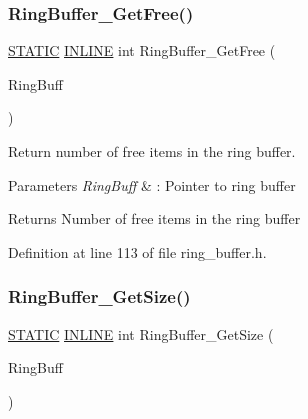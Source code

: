\subsubsection{\texorpdfstring{Ring\+Buffer\+\_\+\+Get\+Free()}{RingBuffer\_GetFree()}}
{\footnotesize\ttfamily \hyperlink{group___l_p_c___types___public___macros_ga10b2d890d871e1489bb02b7e70d9bdfb}{S\+T\+A\+T\+IC} \hyperlink{spifi__18xx__43xx_8h_a2eb6f9e0395b47b8d5e3eeae4fe0c116}{I\+N\+L\+I\+NE} int Ring\+Buffer\+\_\+\+Get\+Free (\begin{DoxyParamCaption}\item[{\hyperlink{struct_r_i_n_g_b_u_f_f___t}{R\+I\+N\+G\+B\+U\+F\+F\+\_\+T} $\ast$}]{Ring\+Buff }\end{DoxyParamCaption})}



Return number of free items in the ring buffer. 


\begin{DoxyParams}{Parameters}
{\em Ring\+Buff} & \+: Pointer to ring buffer \\
\hline
\end{DoxyParams}
\begin{DoxyReturn}{Returns}
Number of free items in the ring buffer 
\end{DoxyReturn}


Definition at line 113 of file ring\+\_\+buffer.\+h.

\mbox{\label{group___ring___buffer_ga2fc4b40b03afb19c8ea942da3cf3faf1}} 
\subsubsection{\texorpdfstring{Ring\+Buffer\+\_\+\+Get\+Size()}{RingBuffer\_GetSize()}}
{\footnotesize\ttfamily \hyperlink{group___l_p_c___types___public___macros_ga10b2d890d871e1489bb02b7e70d9bdfb}{S\+T\+A\+T\+IC} \hyperlink{spifi__18xx__43xx_8h_a2eb6f9e0395b47b8d5e3eeae4fe0c116}{I\+N\+L\+I\+NE} int Ring\+Buffer\+\_\+\+Get\+Size (\begin{DoxyParamCaption}\item[{\hyperlink{struct_r_i_n_g_b_u_f_f___t}{R\+I\+N\+G\+B\+U\+F\+F\+\_\+T} $\ast$}]{Ring\+Buff }\end{DoxyParamCaption})}




